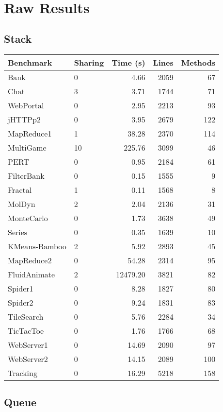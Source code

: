 \documentclass{amsart}[9pt]
\begin{document}
\section{Raw Results}

\subsection{Stack}

\begin{tabular}{|l|l|r|r|r|}
\hline
Benchmark & Sharing & Time (s) & Lines & Methods \\
\hline
Bank & 0 & 4.66 & 2059 & 67 \\
Chat & 3 & 3.71 & 1744 & 71 \\
WebPortal & 0 & 2.95 & 2213 & 93 \\
jHTTPp2 & 0 & 3.95 & 2679 & 122 \\
MapReduce1 & 1 & 38.28 & 2370 & 114 \\
MultiGame & 10 & 225.76 & 3099 & 46 \\
PERT & 0 & 0.95 & 2184 & 61 \\
FilterBank & 0 & 0.15 & 1555 & 9 \\
Fractal & 1 & 0.11 & 1568 & 8 \\
MolDyn & 2 & 2.04 & 2136 & 31 \\
MonteCarlo & 0 & 1.73 & 3638 & 49 \\
Series & 0 & 0.35 & 1639 & 10 \\
KMeans-Bamboo & 2 & 5.92 & 2893 & 45 \\
MapReduce2    & 0 & 54.28 & 2314 & 95 \\
FluidAnimate  & 2 & 12479.20 & 3821 & 82 \\
Spider1       & 0 & 8.28 & 1827 & 80 \\
Spider2       & 0 & 9.24 & 1831 & 83 \\
TileSearch    & 0 & 5.76 & 2284 & 34 \\
TicTacToe     & 0 & 1.76 & 1766 & 68 \\
WebServer1    & 0 & 14.69 & 2090 & 97 \\
WebServer2    & 0 & 14.15 & 2089 & 100 \\
Tracking      & 0 & 16.29 & 5218 & 158 \\
\hline
\end{tabular}



\subsection{Queue}
\end{document}

